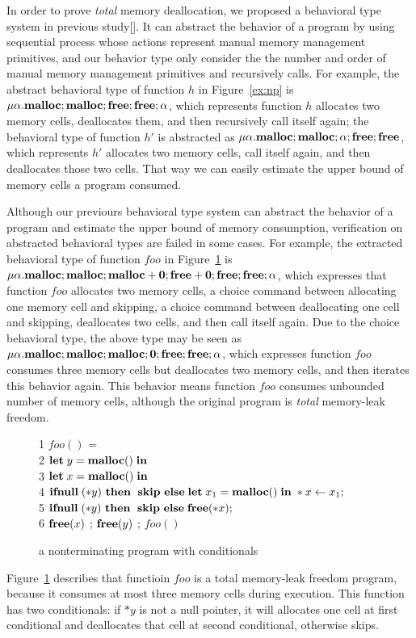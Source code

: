 In order to prove \emph{total} memory deallocation, we proposed a
behavioral type system in previous study[]. It can abstract the
behavior of a program by using sequential process whose actions
represent manual memory management primitives, and our behavior type
only consider the the number and order of manual memory management
primitives and recursively calls. For example, the abstract behavioral
type of function \(h\) in Figure~\ref{ex:np} is
\(\mu\alpha.\mathbf{malloc};\mathbf{malloc};\mathbf{free};\mathbf{free};\alpha\), which represents
function \(h\) allocates two memory cells, deallocates them, and then
recursively call itself again; the behavioral type of function \(h'\)
is abstracted as \(\mu\alpha.\mathbf{malloc};\mathbf{malloc};\alpha;\mathbf{free};\mathbf{free}\),
which represents \(h'\) allocates two memory cells, call itself again,
and then deallocates those two cells. That way we can easily estimate
the upper bound of memory cells a program consumed.

Although our previours behavioral type system can abstract the
behavior of a program and estimate the upper bound of memory
consumption, verification on abstracted behavioral types are failed in
some cases. For example, the extracted behavioral type of function
\(foo\) in Figure~\ref{ex:np2} is \( \mu\alpha.\mathbf{malloc};\mathbf{malloc};\mathbf{malloc}
+ \mathbf{0};\mathbf{free} + \mathbf{0};\mathbf{free};\mathbf{free};\alpha \), which expresses that
function \(foo\) allocates two memory cells, a choice command between
allocating one memory cell and skipping, a choice command between
deallocating one cell and skipping, deallocates two cells, and then
call itself again. Due to the choice behavioral type, the above type
may be seen as \(
\mu\alpha.\mathbf{malloc};\mathbf{malloc};\mathbf{malloc};\mathbf{0};\mathbf{free};\mathbf{free};\alpha \), which
expresses function \(foo\) consumes three memory cells but deallocates
two memory cells, and then iterates this behavior again. This behavior
means function \(foo\) consumes unbounded number of memory cells,
although the original program is \emph{total} memory-leak freedom.

\begin{exmp}\label{ex:ex2}
\begin{figure}[h]
1  \dtb $foo()$ =  \\
2    \dtb \dtb  $\mathbf{let}\; y = \mathbf{malloc()}\; \mathbf{in}\; $ \\
3    \dtb \dtb  $\mathbf{let}\; x = \mathbf{malloc()}\; \mathbf{in}\; $\\
4    \dtb \dtb  $\mathbf{ifnull}\;(*y) \ \mathbf{then}\; \ \mathbf{skip} \ \mathbf{else}\; \mathbf{let}\; x_1 = \mathbf{malloc()}\; \mathbf{in}\;  *x \leftarrow x_1  ;$ \\
5   \dtb \dtb   $\mathbf{ifnull}\;(*y) \ \mathbf{then}\; \ \mathbf{skip} \ \mathbf{else}\; \mathbf{free}(*x) ;$ \\
6   \dtb \dtb   $\mathbf{free}(x)$ ; $\mathbf{free}(y)$ ; $foo()$
\caption{a nonterminating program with conditionals}
\label{ex:np2}
\end{figure}
Figure~\ref{ex:np2} describes that functioin \(foo\) is a total
memory-leak freedom program, because it consumes at most three memory
cells during execution. This function has two conditionals: if \(*y\)
is not a null pointer, it will allocates one cell at first conditional
and deallocates that cell at second conditional, otherwise skips.
\end{exmp}

